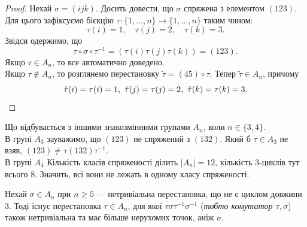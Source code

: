 \documentclass{math_library}
\begin{document}
\begin{proof}
Нехай $\sigma = (ijk)$. Досить довести, що $\sigma$ спряжена з елементом $(123)$. \\
Для цього зафіксуємо бієкцію $\tau \colon \{1,\dots,n\} \to \{1,\dots,n\}$ таким чином: 
\[
\tau(i) = 1,\quad \tau(j) = 2,\quad \tau(k) = 3.
\]
Звідси одержимо, що
\[
\tau \circ \sigma \circ \tau^{-1} = (\tau(i) \tau(j) \tau(k)) = (123).
\]
Якщо $\tau \in A_n$, то все автоматично доведено.\\
Якщо $\tau \notin A_n$, то розглянемо перестановку $\tilde{\tau} = (45) \circ \tau$. Тепер $\tilde{\tau} \in A_n$, причому 
\[
\tilde{\tau}(i) = \tau(i) = 1,\ \tilde{\tau}(j) = \tau(j) = 2,\ \tilde{\tau}(k) = \tau(k) = 3. \qedhere
\]
\end{proof}

\begin{remark}
Що відбувається з іншими знакозмінними групами $A_n$, коли $n \in \{3,4\}$.
\bigskip \\
В групі $A_3$ зауважимо, що $(123)$ не спряжений з $(132)$. Який б $\tau \in A_3$ не взяв, $(123) \neq \tau (132) \tau^{-1}$.\\
В групі $A_4$ Кількість класів спряженості ділить $|A_n| = 12$, кількість $3$-циклів тут всього $8$. Значить, всі вони не лежать в одному класу спряженості.
\end{remark}

\begin{lemma}
Нехай $\sigma \in A_n$ при $n \geq 5$ --- нетривіальна перестановка, що не є циклом довжини $3$. Тоді існує перестановка $\tau \in A_n$, для якої $\tau \sigma \tau^{-1} \sigma^{-1}$ (\textit{тобто комутатор $\tau,\sigma$}) також нетривіальна та має більше нерухомих точок, аніж $\sigma$.
\end{lemma}
\end{document}
